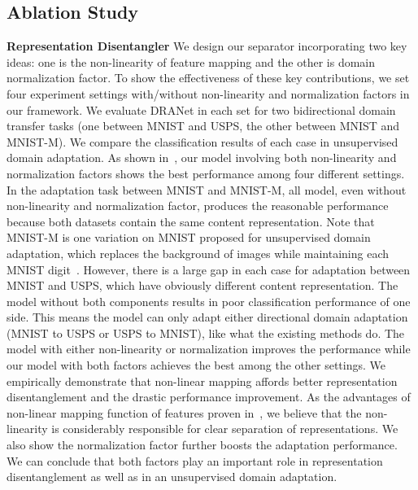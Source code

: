 \documentclass[final]{cvpr}
\begin{document}
\subsection{Ablation Study}
\label{sec:ablation}
\textbf{Representation Disentangler} \quad
We design our separator incorporating two key ideas: one is the non-linearity of feature mapping and the other is domain normalization factor.
To show the effectiveness of these key contributions, we set four experiment settings with/without non-linearity and normalization factors in our framework.
We evaluate DRANet in each set for two bidirectional domain transfer tasks (one between MNIST and USPS, the other between MNIST and MNIST-M).
We compare the classification results of each case in unsupervised domain adaptation.
As shown in~, our model involving both non-linearity and normalization factors shows the best performance among four different settings.
In the adaptation task between MNIST and MNIST-M, all model, even without non-linearity and normalization factor, produces the reasonable performance because both datasets contain the same content representation.
Note that MNIST-M is one variation on MNIST proposed for unsupervised domain adaptation, which replaces the background of images while maintaining each MNIST digit~\cite{ganin2016domain}.
However, there is a large gap in each case for adaptation between MNIST and USPS, which have obviously different content representation.
The model without both components results in poor classification performance of one side. This means the model can only adapt either directional domain adaptation (MNIST to USPS or USPS to MNIST), like what the existing methods do.
The model with either non-linearity or normalization improves the performance while our model with both factors achieves the best among the other settings.
We empirically demonstrate that non-linear mapping affords better representation disentanglement and the drastic performance improvement.
As the advantages of non-linear mapping function of features proven in~\cite{scholkopf1997kernel}, we believe that the non-linearity is considerably responsible for clear separation of representations.
We also show the normalization factor further boosts the adaptation performance. 
We can conclude that both factors play an important role in representation disentanglement as well as in an unsupervised domain adaptation.
\end{document}
